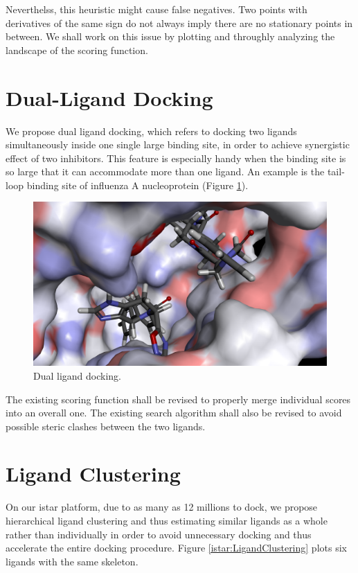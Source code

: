 Neverthelss, this heuristic might cause false negatives. Two points with derivatives of the same sign do not always imply there are no stationary points in between. We shall work on this issue by plotting and throughly analyzing the landscape of the scoring function.

\section{Dual-Ligand Docking}

We propose dual ligand docking, which refers to docking two ligands simultaneously inside one single large binding site, in order to achieve synergistic effect of two inhibitors. This feature is especially handy when the binding site is so large that it can accommodate more than one ligand. An example is the tail-loop binding site of influenza A nucleoprotein (Figure \ref{idock:2IQHDualLigands}).

\begin{figure}
\centering
\includegraphics[width=\textwidth]{idock/2IQHDualLigands.png}
\caption{Dual ligand docking.}
\label{idock:2IQHDualLigands}
\end{figure}

The existing scoring function shall be revised to properly merge individual scores into an overall one. The existing search algorithm shall also be revised to avoid possible steric clashes between the two ligands.

\section{Ligand Clustering}

On our istar platform, due to as many as 12 millions to dock, we propose hierarchical ligand clustering and thus estimating similar ligands as a whole rather than individually in order to avoid unnecessary docking and thus accelerate the entire docking procedure. Figure \ref{istar:LigandClustering} plots six ligands with the same skeleton.

